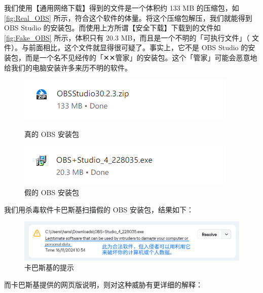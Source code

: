 我们使用【通用网络下载】得到的文件是一个体积约 133 MB 的压缩包，如\autoref{fig:Real_OBS} 所示，符合这个软件的体量。将这个压缩包解压，我们就能得到 OBS Studio 的安装包。而使用上方所谓【安全下载】下载到的文件如\autoref{fig:Fake_OBS} 所示，体积只有 20.3 MB，而且是一个不明的「可执行文件」（ 文件）。与前面相比，这个文件就显得很可疑了。事实上，它不是 OBS Studio 的安装包，而是一个名不见经传的「✕✕管家」的安装包。这个「管家」可能会恶意地给我们的电脑安装许多来历不明的软件。

\begin{figure}[htb!]
  \centering
  \begin{minipage}{.48\textwidth}
    \centering
    \includegraphics[width=.8\textwidth]{assets/basic/Real_OBS.png}
    \caption{真的 OBS 安装包}
    \label{fig:Real_OBS}
  \end{minipage}
  \begin{minipage}{.48\textwidth}
    \centering
    \includegraphics[width=.8\textwidth]{assets/basic/Fake_OBS.png}
    \caption{假的 OBS 安装包}
    \label{fig:Fake_OBS}
  \end{minipage} 
\end{figure}

我们用杀毒软件卡巴斯基扫描假的 OBS 安装包，结果如下：

\begin{figure}[htb!]
  \centering
  \includegraphics[width=.7\textwidth]{assets/basic/Kaspersky_app_warning.png}
  \caption{卡巴斯基的提示}
  \label{fig:Kaspersky_app_warning}
\end{figure}

而卡巴斯基提供的网页版说明，则对这种威胁有更详细的解释：

